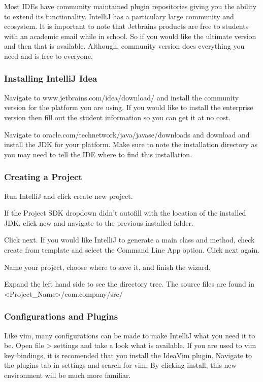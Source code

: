 \documentclass[../../main.tex]{subfiles}
\begin{document}
Most IDEs have community maintained plugin repositories giving you the ability to extend its functionality.
IntelliJ has a particulary large community and ecosystem. It is important to note that Jetbrains products
are free to students with an academic email while in school. So if you would like the ultimate version and
then that is available. Although, community version does everything you need and is free to everyone.

\pagebreak

\subsubsection{Installing IntelliJ Idea}
\begin{steps}
   \item Navigate to www.jetbrains.com/idea/download/ and install the community version for the platform you are using. If you would like to
      install the enterprise version then fill out the student information so you can get it at no cost.
   \item Navigate to oracle.com/technetwork/java/javase/downloads and download and install the JDK for your platform. Make sure to note the
      installation directory as you may need to tell the IDE where to find this installation.
\end{steps}

\subsubsection{Creating a Project}
\begin{steps}
   \item Run IntelliJ and click create new project.
   \item If the Project SDK dropdown didn't autofill with the location of the installed JDK, click new and navigate to the previous installed
      folder.
   \item Click next. If you would like IntelliJ to generate a main class and method, check create from template and select the Command Line App
      option. Click next again.
   \item Name your project, choose where to save it, and finish the wizard.
   \item Expand the left hand side to see the directory tree. The source files are found in <Project_Name>/com.company/src/
\end{steps}

\subsubsection{Configurations and Plugins}
Like vim, many configurations can be made to make IntelliJ what you need it to be. Open file > settings and take a look what is available.
If you are used to vim key bindings, it is recomended that you install the IdeaVim plugin. Navigate to the plugins tab in settings and search
for vim. By clicking install, this new environment will be much more familiar.
\end{document}
